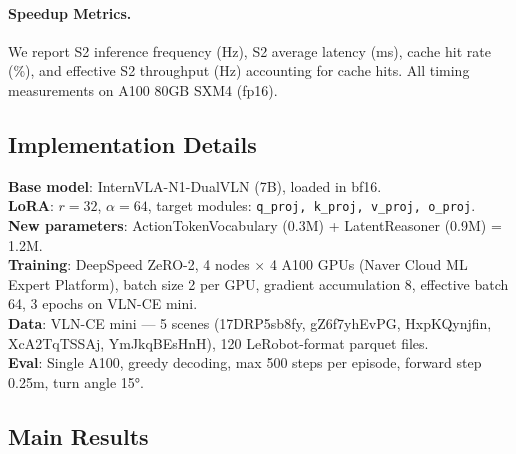 \documentclass[10pt,twocolumn,letterpaper]{article}
\begin{document}
\paragraph{Speedup Metrics.}
We report S2 inference frequency (Hz), S2 average latency (ms), cache hit rate (\%), and effective S2 throughput (Hz) accounting for cache hits. All timing measurements on A100 80GB SXM4 (fp16).

\subsection{Implementation Details}

\textbf{Base model}: InternVLA-N1-DualVLN (7B), loaded in bf16.\\
\textbf{LoRA}: $r=32$, $\alpha=64$, target modules: \texttt{q\_proj, k\_proj, v\_proj, o\_proj}.\\
\textbf{New parameters}: ActionTokenVocabulary (0.3M) + LatentReasoner (0.9M) = 1.2M.\\
\textbf{Training}: DeepSpeed ZeRO-2, 4 nodes $\times$ 4 A100 GPUs (Naver Cloud ML Expert Platform), batch size 2 per GPU, gradient accumulation 8, effective batch 64, 3 epochs on VLN-CE mini.\\
\textbf{Data}: VLN-CE mini — 5 scenes (17DRP5sb8fy, gZ6f7yhEvPG, HxpKQynjfin, XcA2TqTSSAj, YmJkqBEsHnH), 120 LeRobot-format parquet files.\\
\textbf{Eval}: Single A100, greedy decoding, max 500 steps per episode, forward step 0.25m, turn angle 15°.

\subsection{Main Results}
\end{document}
